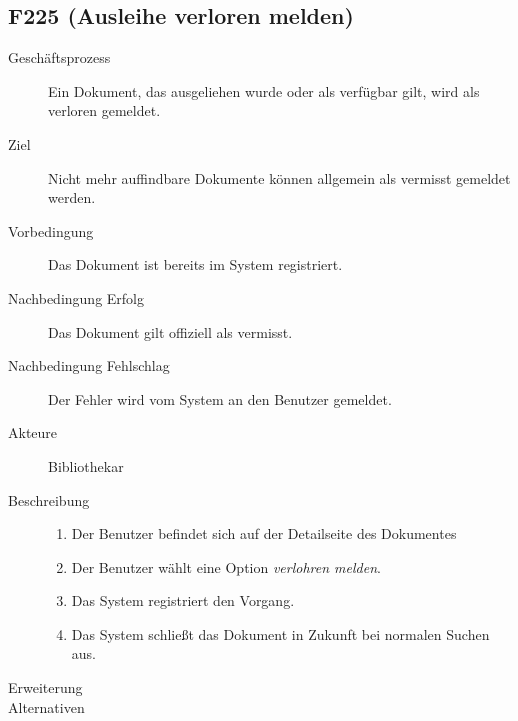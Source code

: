 \subsection{F225 (Ausleihe verloren melden)}
\label{F:AusleiheVerlohren}
\begin{description}
  \item[Geschäftsprozess]Ein Dokument, das ausgeliehen wurde oder als verfügbar gilt, wird als verloren gemeldet.
  \item[Ziel]Nicht mehr auffindbare Dokumente können allgemein als vermisst gemeldet werden.
  \item[Vorbedingung]Das Dokument ist bereits im System registriert.
  \item[Nachbedingung Erfolg]Das Dokument gilt offiziell als vermisst.
  \item[Nachbedingung Fehlschlag]Der Fehler wird vom System an den Benutzer gemeldet.
  \item[Akteure]Bibliothekar
  \item[Beschreibung]\hfill
    \begin{enumerate}
      \item Der Benutzer befindet sich auf der Detailseite des Dokumentes
      \item Der Benutzer wählt eine Option \emph{verlohren melden}.
      \item Das System registriert den Vorgang.
      \item Das System schließt das Dokument in Zukunft bei normalen Suchen aus.
    \end{enumerate}
  \item[Erweiterung]\hfill
  \item[Alternativen]
\end{description}


